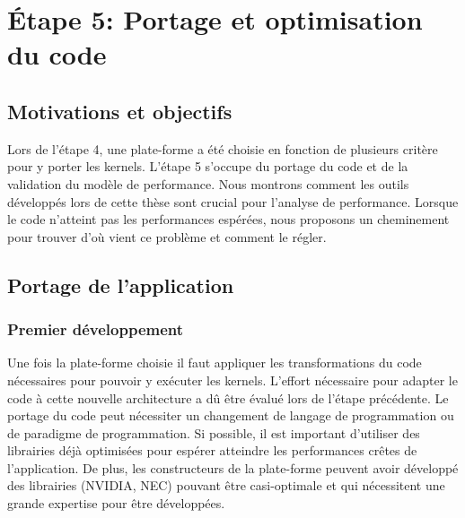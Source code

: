 \section{Étape 5: Portage et optimisation du code}
 

\subsection{Motivations et objectifs}


Lors de l'étape 4, une plate-forme a été choisie en fonction de plusieurs critère pour y porter les kernels. L'étape 5 s'occupe du portage du code et de la validation du modèle de performance. Nous montrons comment les outils développés lors de cette thèse sont crucial pour l'analyse de performance. Lorsque le code n'atteint pas les performances espérées, nous proposons un cheminement pour trouver d'où vient ce problème et comment le régler. 


\subsection{Portage de l'application}


\subsubsection{Premier développement}
Une fois la plate-forme choisie il faut appliquer les transformations du code nécessaires pour pouvoir y exécuter les kernels. L'effort nécessaire pour adapter le code à cette nouvelle architecture a dû être évalué lors de l'étape précédente. Le portage du code peut nécessiter un changement de langage de programmation ou de paradigme de programmation.
Si possible, il est important d'utiliser des librairies déjà optimisées pour espérer atteindre les performances crêtes de l'application. De plus, les constructeurs de la plate-forme peuvent avoir développé des librairies (NVIDIA, NEC) pouvant être casi-optimale et qui nécessitent une grande expertise pour être développées.




